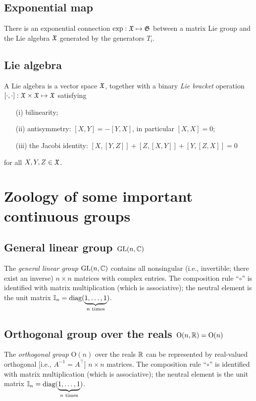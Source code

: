 \subsection{Exponential map}
There is an exponential connection
$\exp : {\frak X} \mapsto {\frak G}$
between a matrix Lie group
and the Lie algebra ${\frak X}$ generated by the generators
$ T_i $.

\subsection{Lie algebra}

A Lie algebra is a vector space ${\frak X}$,
together with a binary
{\em Lie bracket}
operation $[\cdot,\cdot ]: {\frak X} \times {\frak X}  \mapsto {\frak X} $
satisfying
\begin{itemize}
\item[(i)]
bilinearity;
\item[(ii)]
antisymmetry: $[X,Y]=-[Y,X]$, in particular $[X,X]=0$;
\item[(iii)]
the Jacobi identity:
$[X,[Y,Z]] +  [Z,[X,Y]] + [Y,[Z,X]] =0$
\end{itemize}
for all $X,Y,Z \in {\frak X}$.


\section{Zoology of some important continuous groups}

\subsection{General linear group $\textrm{GL}(n,{\Bbb C})$}

The {\em general linear group} $\textrm{GL}(n,{\Bbb C})$
contains all  nonsingular (i.e., invertible; there exist an inverse)
$n\times n$ matrices with complex entries.
The composition rule ``$\circ$''
is identified with matrix multiplication (which is associative); the neutral element is the unit
matrix ${\Bbb I}_n=\textrm{diag}(\underbrace{1,\ldots ,1}_{n \textrm{ times}})$.

\subsection{Orthogonal group over the reals $\textrm{O}(n,{\Bbb R})=\textrm{O}(n)$}

The {\em orthogonal group}\cite{murnaghan} $\textrm{O}(n)$ over the reals ${\Bbb R}$
can be represented by real-valued  orthogonal [i.e., $  A  ^{-1}=    A   ^\intercal $]
$n\times n$ matrices.
The composition rule ``$\circ$''
is identified with matrix multiplication (which is associative); the neutral element is the unit
matrix ${\Bbb I}_n=\textrm{diag}(\underbrace{1,\ldots ,1}_{n \textrm{ times}})$.

